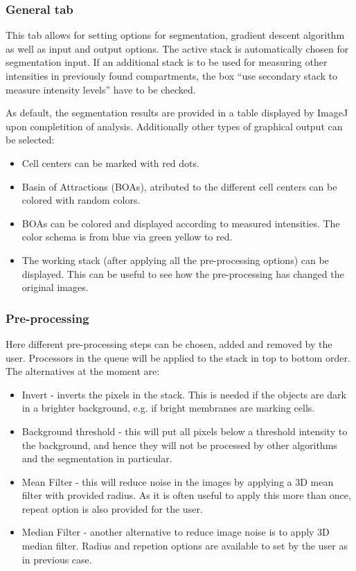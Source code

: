 \documentclass[a4paper,12pt]{article}
\begin{document}
\subsubsection{General tab}

This tab allows for setting options for segmentation, gradient descent algorithm as well as input and output options. The active
stack is automatically chosen for segmentation input. If an additional stack is to
be used for measuring other intensities in previously found compartments, the box ``use secondary stack to measure intensity levels'' have to be checked.

As default, the segmentation results are provided in a table displayed by
ImageJ upon completition of analysis. Additionally other types of graphical output can be selected:

\begin{itemize}
%
\item Cell centers can be marked with red dots.
%
\item Basin of Attractions (BOAs), atributed to the different cell centers can be
	colored with random colors.
%
\item BOAs can be colored and displayed according to measured intensities. The color schema is from blue via green yellow to red.
%
\item The working stack (after applying all the pre-processing options) can be displayed. This can be useful to see how the
	pre-processing has changed the original images.
%
\end{itemize}

\subsubsection{Pre-processing}

Here different pre-processing steps can be chosen, added and removed by the
user. Processors in the queue will be applied to the stack in top to bottom order. The alternatives at the moment are:

\begin{itemize}
%
\item Invert - inverts the pixels in the stack. This is needed if the objects
	are dark in a brighter background, e.g. if bright membranes are marking
	cells.
%
\item Background threshold - this will put all pixels below a threshold
	intensity to the background, and hence they will not be processed by other algorithms and 
	the segmentation in particular.
%
\item Mean Filter - this will reduce noise in the images by applying a 3D mean
	filter with provided radius. As it is often useful to apply this more than
	once, repeat option is also provided for the user.
%
\item Median Filter - another alternative to reduce image noise is to apply 3D median filter.
	Radius and repetion options are available to set by the user as in previous case.
%
\end{itemize}
\end{document}
